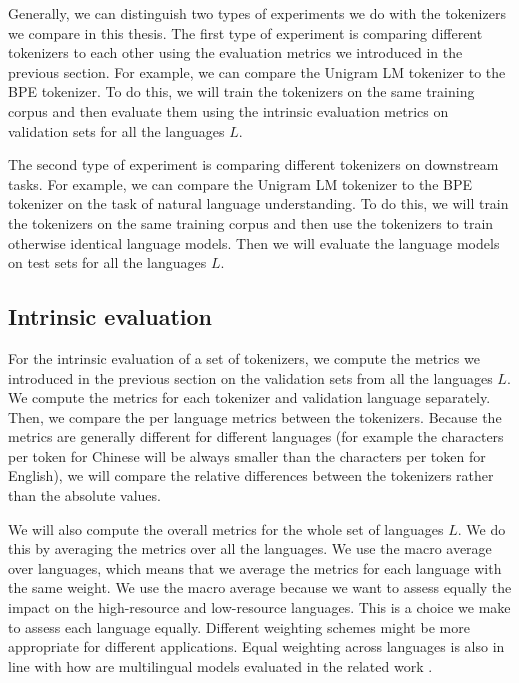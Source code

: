 Generally, we can distinguish two types of experiments we do with the tokenizers we compare in this thesis. The first type of experiment is comparing different tokenizers to each other using the evaluation metrics we introduced in the previous section. For example, we can compare the Unigram LM tokenizer to the BPE tokenizer. To do this, we will train the tokenizers on the same training corpus and then evaluate them using the intrinsic evaluation metrics on validation sets for all the languages $L$. 

The second type of experiment is comparing different tokenizers on downstream tasks. For example, we can compare the Unigram LM tokenizer to the BPE tokenizer on the task of natural language understanding. To do this, we will train the tokenizers on the same training corpus and then use the tokenizers to train otherwise identical language models. Then we will evaluate the language models on test sets for all the languages $L$. 

\subsection{Intrinsic evaluation}
\label{sec:intrinsic_evaluation}

For the intrinsic evaluation of a set of tokenizers, we compute the metrics we introduced in the previous section on the validation sets from all the languages $L$. We compute the metrics for each tokenizer and validation language separately. Then, we compare the per language metrics between the tokenizers. Because the metrics are generally different for different languages (for example the characters per token for Chinese will be always smaller than the characters per token for English), we will compare the relative differences between the tokenizers rather than the absolute values.

We will also compute the overall metrics for the whole set of languages $L$. We do this by averaging the metrics over all the languages. We use the macro average over languages, which means that we average the metrics for each language with the same weight. We use the macro average because we want to assess equally the impact on the high-resource and low-resource languages. This is a choice we make to assess each language equally. Different weighting schemes might be more appropriate for different applications. Equal weighting across languages is also in line with how are multilingual models evaluated in the related work \cite{ruder_xtreme-r_2021}.

